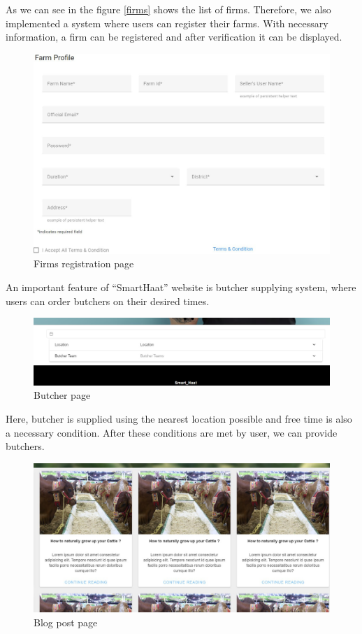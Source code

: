 \documentclass[a4paper,12pt]{report}
\begin{document}
As we can see in the figure \ref{firms} shows the list of firms. Therefore, we also implemented a system where users can register their farms. With necessary information, a firm can be registered and after verification it can be displayed.
\begin{figure}[H]
\centering
\includegraphics[keepaspectratio, width=12cm]{reg-firm.jpg}
\caption{Firms registration page}
\label{firms-reg}
\end{figure}
An important feature of ``SmartHaat'' website is butcher supplying system, where users can order butchers on their desired times.
\begin{figure}[H]
\centering
\includegraphics[keepaspectratio, width=12cm]{butcher.jpg}
\caption{Butcher page}
\label{butcher}
\end{figure}
Here, butcher is supplied using the nearest location possible and free time is also a necessary condition. After these conditions are met by user, we can provide butchers.
\begin{figure}[H]
\centering
\includegraphics[keepaspectratio, width=12cm]{blog.jpg}
\caption{Blog post page}
\label{blog}
\end{figure}
\end{document}
